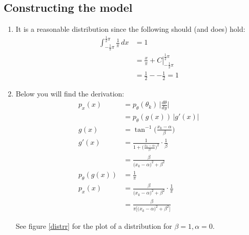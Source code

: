 \documentclass[paper=a4, fontsize=10pt]{scrartcl} %
\numberwithin{equation}{section} %
\numberwithin{figure}{section} %
\numberwithin{table}{section} %
\begin{document}
\subsection{Constructing the model}
\begin{enumerate}
	\item It is a reasonable distribution since the following should (and does) hold:
			\begin{align}
				\int_{-\frac{1}{2}\pi}^{\frac{1}{2}\pi} \frac{1}{\pi} \, dx &= 1 \tag{To be proven}\\
				&= \left. \frac{x}{\pi} + C \right|_{-\frac{1}{2}\pi}^{\frac{1}{2}\pi}\\
				&= \frac{1}{2} - - \frac{1}{2} = 1
			\end{align}
	\item 
			Below you will find the derivation:
			\begin{align}
				p_x(x) &= p_\theta(\theta_k) \, \bigg\vert \frac{d\theta}{dy} \bigg\vert \\
				&= p_\theta(g(x)) \, \big\vert g'(x) \big\vert \\
				g(x) &= \tan^{-1} \bigg(\frac{x_k - \alpha}{\beta}\bigg) \\
				g'(x) &= \frac{1}{1 + \bigg(\frac{x_k - \alpha}{\beta}\bigg)^2} \cdot \frac{1}{\beta} \\
				&= \frac{\beta}{\big(x_k - \alpha\big)^2 + \beta^2} \\
				p_\theta(g(x)) &= \frac{1}{\pi} \\
				p_x(x) &= \frac{\beta}{\big(x_k - \alpha\big)^2 + \beta^2} \cdot \frac{1}{\pi} \\
				&= \frac{\beta}{\pi \big[\big(x_k - \alpha\big)^2 + \beta^2\big]} 
			\end{align}

			See figure \ref{distrr} for the plot of a distribution for $\beta = 1, \alpha = 0$.


\end{enumerate}
\end{document}
